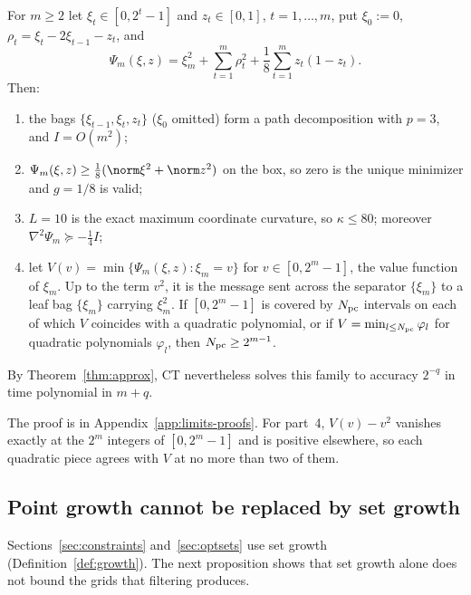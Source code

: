 \begin{proposition}
\label{lim:prop:messages}
For $m\ge2$ let $\xi_t\in[0,2^t-1]$ and $z_t\in[0,1]$, $t=1,\ldots,m$, put
$\xi_0:=0$, $\rho_t=\xi_t-2\xi_{t-1}-z_t$, and
\[
\Psi_m(\xi,z)=\xi_m^2+\sum_{t=1}^m\rho_t^2+\frac18\sum_{t=1}^mz_t(1-z_t).
\]
Then:
\begin{enumerate}
\item the bags $\{\xi_{t-1},\xi_t,z_t\}$ ($\xi_0$ omitted) form a path
  decomposition with $p=3$, and $I=O(m^2)$;
\item $\Psi_m(\xi,z)\ge\frac18(\norm\xi^2+\norm z^2)$ on the box, so zero is
  the unique minimizer and $g=1/8$ is valid;
\item $L=10$ is the exact maximum coordinate curvature, so $\kappa\le80$;
  moreover $\nabla^2\Psi_m\succeq-\frac14I$;
\item let $V(v)=\min\{\Psi_m(\xi,z):\xi_m=v\}$ for $v\in[0,2^m-1]$, the
  value function of $\xi_m$. Up to the term $v^2$, it is the message sent
  across the separator $\{\xi_m\}$ to a leaf bag $\{\xi_m\}$ carrying
  $\xi_m^2$. If $[0,2^m-1]$ is covered by $N_{\rm pc}$ intervals on each of
  which $V$ coincides with a quadratic polynomial, or if
  $V=\min_{l\le N_{\rm pc}}\varphi_l$ for quadratic polynomials $\varphi_l$,
  then $N_{\rm pc}\ge2^{m-1}$.
\end{enumerate}
By Theorem~\ref{thm:approx}, CT nevertheless solves this family to accuracy
$2^{-q}$ in time polynomial in $m+q$.
\end{proposition}

The proof is in Appendix~\ref{app:limits-proofs}. For part~4, $V(v)-v^2$
vanishes exactly at the $2^m$ integers of $[0,2^m-1]$ and is positive
elsewhere, so each quadratic piece agrees with $V$ at no more than two of
them.

\subsection{Point growth cannot be replaced by set growth}
\label{sec:limits-setgrowth}

Sections~\ref{sec:constraints} and~\ref{sec:optsets} use set growth
(Definition~\ref{def:growth}). The next proposition shows that set growth
alone does not bound the grids that filtering produces.

